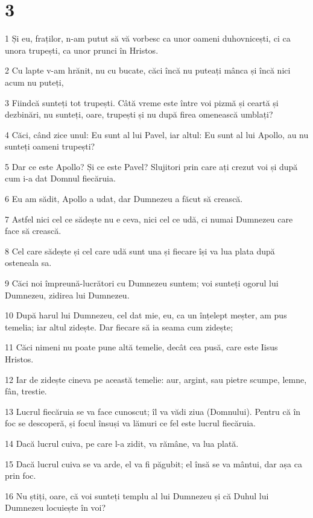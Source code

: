 \chapter{3}

\par 1 Și eu, fraților, n-am putut să vă vorbesc ca unor oameni duhovnicești, ci ca unora trupești, ca unor prunci în Hristos.
\par 2 Cu lapte v-am hrănit, nu cu bucate, căci încă nu puteați mânca și încă nici acum nu puteți,
\par 3 Fiindcă sunteți tot trupești. Câtă vreme este între voi pizmă și ceartă și dezbinări, nu sunteți, oare, trupești și nu după firea omenească umblați?
\par 4 Căci, când zice unul: Eu sunt al lui Pavel, iar altul: Eu sunt al lui Apollo, au nu sunteți oameni trupești?
\par 5 Dar ce este Apollo? Și ce este Pavel? Slujitori prin care ați crezut voi și după cum i-a dat Domnul fiecăruia.
\par 6 Eu am sădit, Apollo a udat, dar Dumnezeu a făcut să crească.
\par 7 Astfel nici cel ce sădește nu e ceva, nici cel ce udă, ci numai Dumnezeu care face să crească.
\par 8 Cel care sădește și cel care udă sunt una și fiecare își va lua plata după osteneala sa.
\par 9 Căci noi împreună-lucrători cu Dumnezeu suntem; voi sunteți ogorul lui Dumnezeu, zidirea lui Dumnezeu.
\par 10 După harul lui Dumnezeu, cel dat mie, eu, ca un înțelept meșter, am pus temelia; iar altul zidește. Dar fiecare să ia seama cum zidește;
\par 11 Căci nimeni nu poate pune altă temelie, decât cea pusă, care este Iisus Hristos.
\par 12 Iar de zidește cineva pe această temelie: aur, argint, sau pietre scumpe, lemne, fân, trestie.
\par 13 Lucrul fiecăruia se va face cunoscut; îl va vădi ziua (Domnului). Pentru că în foc se descoperă, și focul însuși va lămuri ce fel este lucrul fiecăruia.
\par 14 Dacă lucrul cuiva, pe care l-a zidit, va rămâne, va lua plată.
\par 15 Dacă lucrul cuiva se va arde, el va fi păgubit; el însă se va mântui, dar așa ca prin foc.
\par 16 Nu știți, oare, că voi sunteți templu al lui Dumnezeu și că Duhul lui Dumnezeu locuiește în voi?
